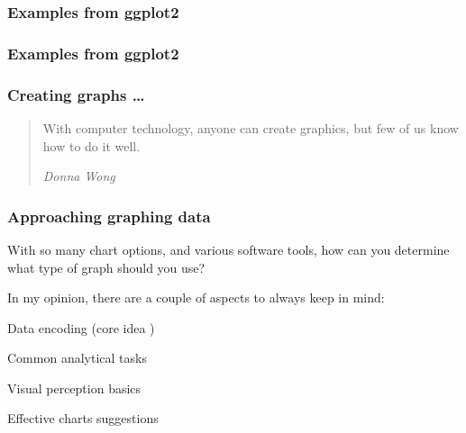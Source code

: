 \documentclass[12pt]{beamer}\usepackage[]{graphicx}\usepackage[]{color}
\begin{document}
\begin{frame}
\frametitle{Examples from ggplot2}
\begin{center}
\end{center}
\end{frame}


\begin{frame}
\frametitle{Examples from ggplot2}
\begin{center}
\end{center}
\end{frame}


\begin{frame}
\begin{center}
\Huge{}
\end{center}
\end{frame}


\begin{frame}
\frametitle{Creating graphs \dots}

{\Large
\begin{quotation}
\noindent With computer technology, anyone can create graphics, but few of us know how to do it well.

\bigskip
{\small \noindent \textit{Donna Wong}}

\end{quotation}
}

\end{frame}


\begin{frame}
\frametitle{Approaching graphing data}

With so many chart options, and various software tools, how can you determine what type of graph should you use?

\bigskip

In my opinion, there are a couple of aspects to always keep in mind:

\bi
  \item Data encoding (core idea )
  \item Common analytical tasks
  \item Visual perception basics
  \item Effective charts suggestions
\ei

\end{frame}

\end{document}
